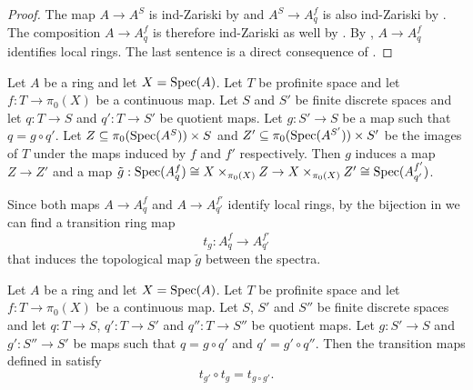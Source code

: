 \begin{proof}
  \leanok
  The map $A \to A^S$ is ind-Zariski by  and $A^S \to A^f_{q}$ is also ind-Zariski by .  The composition $A \to A^f_{q}$ is therefore ind-Zariski as well by . By , $A \to A^f_{q}$ identifies local rings. The last sentence is a direct consequence of .
\end{proof}

\begin{definition}
  \label{def:modify-pi0-transition-map}
  Let $A$ be a ring and let $X = \operatorname{Spec} (A)$. Let $T$ be profinite space and let $f : T \to \pi_0(X)$ be a continuous map. Let \(S\) and \(S'\) be finite discrete spaces and let \(q : T \to S\) and \(q' : T \to S'\) be quotient maps. Let \(g : S' \to S\) be a map such that \(q = g \circ q'\). Let \(Z \subseteq \pi_0(\operatorname{Spec} (A^{S})) \times S\) and \(Z' \subseteq \pi_0(\operatorname{Spec} (A^{S'})) \times S'\) be the images of \(T\) under the maps induced by \(f\) and \(f'\) respectively. Then \(g\) induces a map \(Z \to Z'\) and a map \(\tilde{g} : \operatorname{Spec} (A^f_{q}) \cong X \times_{\pi_0(X)} Z \to X \times_{\pi_0(X)} Z' \cong \operatorname{Spec} (A^{f'}_{q'})\).

  Since both maps \(A \to A^f_{q}\) and \(A \to A^{f'}_{q'}\) identify local rings, by the bijection in  we can find a transition ring map
  \[t_{g}: A^f_{q} \to A^{f'}_{q'}\]
  that induces the topological map \(\tilde{g}\) between the spectra.
\end{definition}

\begin{lemma}
  \label{thm:modify-pi0-transition-map-compatible}
  Let $A$ be a ring and let $X = \operatorname{Spec} (A)$. Let $T$ be profinite space and let $f : T \to \pi_0(X)$ be a continuous map. Let \(S\), \(S'\) and \(S''\) be finite discrete spaces and let \(q : T \to S\), \(q' : T \to S'\) and \(q'' : T \to S''\) be quotient maps. Let \(g : S' \to S\) and \(g' : S'' \to S'\) be maps such that \(q = g \circ q'\) and \(q' = g' \circ q''\). Then the transition maps defined in  satisfy
  \[t_{g'} \circ t_{g} = t_{g \circ g'}.\]
\end{lemma}

